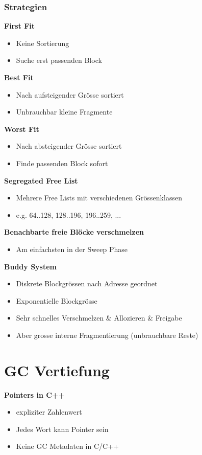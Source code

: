 \subsubsection{Strategien}
\textbf{First Fit}
\begin{itemize}
    \item Keine Sortierung
    \item Suche erst passenden Block
\end{itemize}
\textbf{Best Fit}
\begin{itemize}
    \item Nach aufsteigender Grösse sortiert
    \item Unbrauchbar kleine Fragmente
\end{itemize}
\textbf{Worst Fit}
\begin{itemize}
    \item Nach absteigender Grösse sortiert
    \item Finde passenden Block sofort
\end{itemize}
\textbf{Segregated Free List}
\begin{itemize}
    \item Mehrere Free Lists mit verschiedenen Grössenklassen
    \item e.g. 64..128, 128..196, 196..259, ...
\end{itemize}
\textbf{Benachbarte freie Blöcke verschmelzen}
\begin{itemize}
    \item Am einfachsten in der Sweep Phase
\end{itemize}
\textbf{Buddy System}
\begin{itemize}
    \item Diskrete Blockgrössen nach Adresse geordnet
    \item Exponentielle Blockgrösse
    \item Sehr schnelles Verschmelzen \& Allozieren \& Freigabe
    \item Aber grosse interne Fragmentierung (unbrauchbare Reste)
\end{itemize}

\section{GC Vertiefung}
\textbf{Pointers in C++}
\begin{itemize}
    \item expliziter Zahlenwert
    \item Jedes Wort kann Pointer sein
    \item Keine GC Metadaten in C/C++
\end{itemize}


